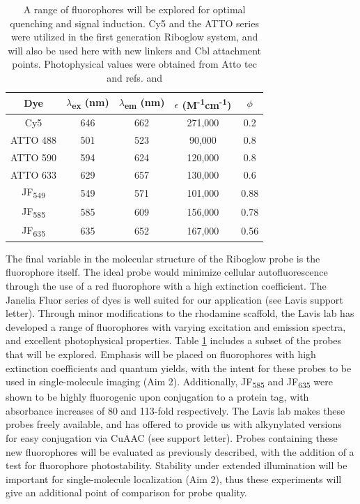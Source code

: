 \begin{table}
\caption{A range of fluorophores will be explored for optimal quenching and signal induction. Cy5 and the ATTO series were utilized in the first generation Riboglow system, and will also be used here with new linkers and Cbl attachment points. Photophysical values were obtained from Atto tec and refs. \cite{BraselmannDevelopmentriboswitchbasedplatform2017} and \cite{Grimmgeneralmethodfinetune2017}}\label{fluorophores}
\begin{tabular}{c|cccc}
  \toprule
 Dye &  $\lambda$\textsubscript{ex} (nm) &  $\lambda$\textsubscript{em} (nm) &  $\epsilon$ (M\textsuperscript{-1}cm\textsuperscript{-1}) &  $\phi$ \\\toprule
Cy5 & 646 & 662 & 271,000 & 0.2\\
ATTO 488 & 501 & 523 & 90,000 & 0.8\\
ATTO 590 & 594 & 624 & 120,000 & 0.8\\
ATTO 633 & 629 & 657 & 130,000 & 0.6\\  \hline
JF\textsubscript{549} & 549 & 571 & 101,000 & 0.88\\
JF\textsubscript{585} & 585 & 609 & 156,000 & 0.78\\
JF\textsubscript{635} & 635 & 652 & 167,000 & 0.56\\
\bottomrule
\end{tabular}
\end{table}

The final variable in the molecular structure of the Riboglow probe is the fluorophore itself. The ideal probe would minimize cellular autofluorescence through the use of a red fluorophore with a high extinction coefficient. The Janelia Fluor series of dyes is well suited for our application (see Lavis support letter)\cite{Grimmgeneralmethodfinetune2017,Grimmgeneralmethodimprove2015}. Through minor modifications to the rhodamine scaffold, the Lavis lab has developed a range of fluorophores with varying excitation and emission spectra, and excellent photophysical properties.
Table \ref{fluorophores} includes a subset of the probes that will be explored.
Emphasis will be placed on fluorophores with high extinction coefficients and quantum yields, with the intent for these probes to be used in single-molecule imaging (Aim 2).
Additionally, JF\textsubscript{585} and JF\textsubscript{635} were shown to be highly fluorogenic upon conjugation to a protein tag, with absorbance increases of 80 and 113-fold respectively\cite{Grimmgeneralmethodfinetune2017}.
The Lavis lab makes these probes freely available, and has offered to provide us with alkynylated versions for easy conjugation via CuAAC (see support letter).
Probes containing these new fluorophores will be evaluated as previously described, with the addition of a test for fluorophore photostability.
Stability under extended illumination will be important for single-molecule localization (Aim 2), thus these experiments will give an additional point of comparison for probe quality.

